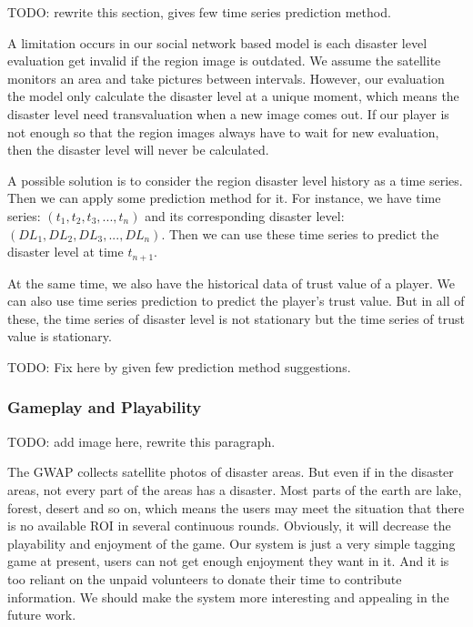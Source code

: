 TODO: rewrite this section, gives few time series prediction method.

A limitation occurs in our social network based model is each disaster level evaluation get invalid 
if the region image is outdated. 
We assume the satellite monitors an area and take pictures between intervals. However, our evaluation
the model only calculate the disaster level at a unique moment, which means the disaster level need 
transvaluation when a new image comes out.
If our player is not enough so that the region images always have to wait for new evaluation, then the
disaster level will never be calculated.

A possible solution is to consider the region disaster level history as a time series. Then we can apply
some prediction method for it. For instance, we have time series: $(t_1, t_2, t_3, ..., t_n)$
and its corresponding disaster level: $(DL_1, DL_2, DL_3, ..., DL_n)$.
Then we can use these time series to predict the disaster level at time $t_{n+1}$.

At the same time, we also have the historical data of trust value of a player. We can also
use time series prediction to predict the player's trust value. But in all of these, the time series
of disaster level is not stationary but the time series of trust value is stationary.

TODO: Fix here by given few prediction method suggestions.

\subsubsection{Gameplay and Playability}

TODO: add image here, rewrite this paragraph.

The GWAP collects satellite photos of disaster areas. But even if in the disaster areas, 
not every part of the areas has a disaster. Most parts of the earth are lake, forest, 
desert and so on, which means the users may meet the situation that there is no available 
ROI in several continuous rounds. Obviously, it will decrease the playability and enjoyment of the game.
Our system is just a very simple tagging game at present, users can not get enough enjoyment they want in it. 
And it is too reliant on the unpaid volunteers to donate their time to contribute information. 
We should make the system more interesting and appealing in the future work.
